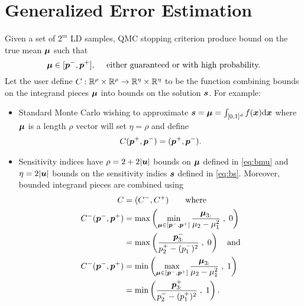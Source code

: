 \documentclass{article}
\begin{document}
\section{Generalized Error Estimation} \label{sec: Generalized Error Estimation}


Given a set of $2^m$ LD samples, QMC stopping criterion produce bound on the true mean $\boldsymbol{\mu}$ such that
\begin{equation}
    \boldsymbol{\mu} \in [\boldsymbol{p}^-,\boldsymbol{p}^+], \quad \text{ either guaranteed or with high probability.}
\end{equation}
Let the user define $C: \mathbb{R}^\rho \times \mathbb{R}^\rho \to \mathbb{R}^\eta \times \mathbb{R}^\eta$ to be the function combining bounds on the integrand pieces $\boldsymbol{\mu}$ into bounds on the solution $\boldsymbol{s}$. For example:
\begin{itemize}
    \item Standard Monte Carlo wishing to approximate $\boldsymbol{s} = \boldsymbol{\mu} = \int_{[0,1]^d} f(\boldsymbol{x})\mathrm{d}\boldsymbol{x}$ where $\boldsymbol{\mu}$ is a length $\rho$ vector will set $\eta = \rho$ and define 
    \begin{align}
        C(\boldsymbol{p}^+,\boldsymbol{p}^-) = (\boldsymbol{p}^+,\boldsymbol{p}^-).
    \end{align}
    \item Sensitivity indices have $\rho=2+2\lvert \boldsymbol{u} \rvert$ bounds on $\boldsymbol{\mu}$ defined in \eqref{eq:bmu}
    and $\eta=2\lvert \boldsymbol{u} \rvert$ bounds on the sensitivity indies $\boldsymbol{s}$ defined in \eqref{eq:bs}. Moreover, bounded integrand pieces are combined using
    \begin{subequations}
    \label{eq:C_senstivity}    
    \begin{align}
        C 
        &= (C^-,C^+) \qquad \text{where}  \\
        C^-(\boldsymbol{p}^-,\boldsymbol{p}^+)
        &=
        \max\left(\min_{\boldsymbol{\mu} \in [\boldsymbol{p}^-,\boldsymbol{p}^+]} \frac{\boldsymbol{\mu}_{3:}}{\mu_2-\mu_1^2} \;,\; 0\right) \\
        &= \max\left( \frac{\boldsymbol{p}_{3:}^-}{p_2^+ - (p_1^-)^2} \;,\; 0\right) \quad \text{and}\\
        C^-(\boldsymbol{p}^-,\boldsymbol{p}^+) &=
        \min\left(\max_{\boldsymbol{\mu} \in [\boldsymbol{p}^-,\boldsymbol{p}^+]} \frac{\boldsymbol{\mu}_{3:}}{\mu_2-\mu_1^2} \;,\; 1\right) \\
        &= \min\left( \frac{\boldsymbol{p}_{3:}^+}{p_2^- - (p_1^+)^2} \;,\; 1\right).\\
    \end{align}
    \end{subequations}

\end{itemize}
\end{document}

